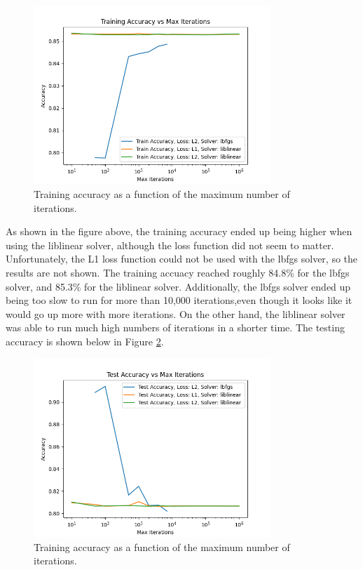 \documentclass[12pt]{article}
\begin{document}
\begin{figure}[H]
\centering
\includegraphics[width=0.8\textwidth]{train_accuracy.png} %
\caption{Training accuracy as a function of the maximum number of iterations.}
\label{fig:results}
\end{figure}

As shown in the figure above, the training accuracy ended up being higher when
using the liblinear solver, although the loss function did not seem to matter. 
Unfortunately, the L1 loss function could not be used with the lbfgs solver,
so the results are not shown. The training accuacy reached roughly 84.8\% for 
the lbfgs solver, and 85.3\% for the liblinear solver. Additionally, the lbfgs solver
ended up being too slow to run for more than 
10,000 iterations,even though it looks like it would go up more with more iterations. 
On the other hand, the liblinear solver was able to run much high numbers of iterations
in a shorter time. The testing accuracy is shown 
below in Figure \ref{fig:results2}.

\begin{figure}[H]
\centering
\includegraphics[width=0.8\textwidth]{test_accuracy.png} %
\caption{Training accuracy as a function of the maximum number of iterations.}
\label{fig:results2}
\end{figure}
    
\end{document}
